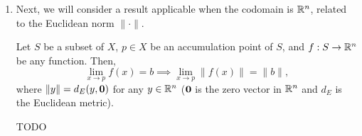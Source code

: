 \begin{enumerate}
\item Next, we will consider a result applicable when the codomain is \(\mathbb{R}^n\),
related to the Euclidean norm \(\|\cdot\|\).
\begin{proposition}
\label{prp:lim-norm}
Let \(S\) be a subset of \(X\), \(p\in X\) be an accumulation point of \(S\),
and \(f:S\to\mathbb{R}^n\) be any function. Then,
\[
\lim_{x\to p}f(x)=b\implies \lim_{x\to p}\|f(x)\|=\|b\|,
\]
where \(\|y\|=d_E(y,\vb*{0})\) for any \(y\in\mathbb{R}^n\) (\(\vb*{0}\) is
the zero vector in \(\mathbb{R}^n\) and \(d_E\) is the Euclidean metric).
\end{proposition}
\begin{pf}
TODO
\end{pf}
\end{enumerate}

